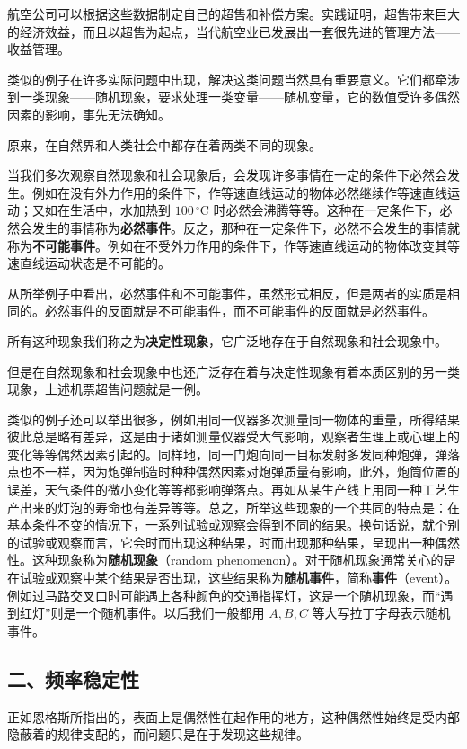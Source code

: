 \documentclass[../../main.tex]{subfiles}
\begin{document}
航空公司可以根据这些数据制定自己的超售和补偿方案。实践证明，超售带来巨大的经济效益，而且以超售为起点，当代航空业已发展出一套很先进的管理方法——收益管理。

类似的例子在许多实际问题中出现，解决这类问题当然具有重要意义。它们都牵涉到一类现象——随机现象，要求处理一类变量——随机变量，它的数值受许多偶然因素的影响，事先无法确知。

原来，在自然界和人类社会中都存在着两类不同的现象。

当我们多次观察自然现象和社会现象后，会发现许多事情在一定的条件下必然会发生。例如在没有外力作用的条件下，作等速直线运动的物体必然继续作等速直线运动；又如在生活中，水加热到 $100\,^{\circ}\mathrm{C}$ 时必然会沸腾等等。这种在一定条件下，必然会发生的事情称为\textbf{必然事件}。反之，那种在一定条件下，必然不会发生的事情就称为\textbf{不可能事件}。例如在不受外力作用的条件下，作等速直线运动的物体改变其等速直线运动状态是不可能的。

从所举例子中看出，必然事件和不可能事件，虽然形式相反，但是两者的实质是相同的。必然事件的反面就是不可能事件，而不可能事件的反面就是必然事件。

所有这种现象我们称之为\textbf{决定性现象}，它广泛地存在于自然现象和社会现象中。

但是在自然现象和社会现象中也还广泛存在着与决定性现象有着本质区别的另一类现象，上述机票超售问题就是一例。

类似的例子还可以举出很多，例如用同一仪器多次测量同一物体的重量，所得结果彼此总是略有差异，这是由于诸如测量仪器受大气影响，观察者生理上或心理上的变化等等偶然因素引起的。同样地，同一门炮向同一目标发射多发同种炮弹，弹落点也不一样，因为炮弹制造时种种偶然因素对炮弹质量有影响，此外，炮筒位置的误差，天气条件的微小变化等等都影响弹落点。再如从某生产线上用同一种工艺生产出来的灯泡的寿命也有差异等等。总之，所举这些现象的一个共同的特点是：在基本条件不变的情况下，一系列试验或观察会得到不同的结果。换句话说，就个别的试验或观察而言，它会时而出现这种结果，时而出现那种结果，呈现出一种偶然性。这种现象称为\textbf{随机现象}（random phenomenon）。对于随机现象通常关心的是在试验或观察中某个结果是否出现，这些结果称为\textbf{随机事件}，简称\textbf{事件}（event）。例如过马路交叉口时可能遇上各种颜色的交通指挥灯，这是一个随机现象，而“遇到红灯”则是一个随机事件。以后我们一般都用 $A,B,C$ 等大写拉丁字母表示随机事件。

\subsection*{二、频率稳定性}

正如恩格斯所指出的，表面上是偶然性在起作用的地方，这种偶然性始终是受内部隐蔽着的规律支配的，而问题只是在于发现这些规律。
\end{document}
